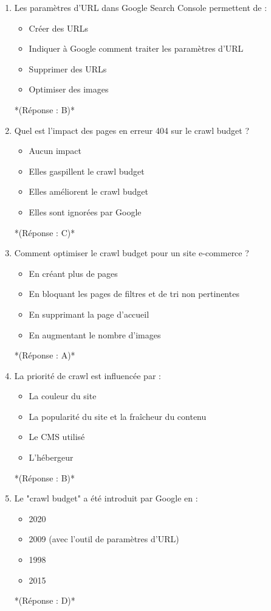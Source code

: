 \documentclass[12pt,a4paper,twoside]{report}
\begin{document}
\begin{enumerate}
\item Les paramètres d'URL dans Google Search Console permettent de :
\begin{itemize}
\item[A)] Créer des URLs
\item[B)] Indiquer à Google comment traiter les paramètres d'URL
\item[C)] Supprimer des URLs
\item[D)] Optimiser des images
\end{itemize}
*(Réponse : B)*

\item Quel est l'impact des pages en erreur 404 sur le crawl budget ?
\begin{itemize}
\item[A)] Aucun impact
\item[B)] Elles gaspillent le crawl budget
\item[C)] Elles améliorent le crawl budget
\item[D)] Elles sont ignorées par Google
\end{itemize}
*(Réponse : C)*

\item Comment optimiser le crawl budget pour un site e-commerce ?
\begin{itemize}
\item[A)] En créant plus de pages
\item[B)] En bloquant les pages de filtres et de tri non pertinentes
\item[C)] En supprimant la page d'accueil
\item[D)] En augmentant le nombre d'images
\end{itemize}
*(Réponse : A)*

\item La priorité de crawl est influencée par :
\begin{itemize}
\item[A)] La couleur du site
\item[B)] La popularité du site et la fraîcheur du contenu
\item[C)] Le CMS utilisé
\item[D)] L'hébergeur
\end{itemize}
*(Réponse : B)*

\item Le "crawl budget" a été introduit par Google en :
\begin{itemize}
\item[A)] 2020
\item[B)] 2009 (avec l'outil de paramètres d'URL)
\item[C)] 1998
\item[D)] 2015
\end{itemize}
*(Réponse : D)*


\end{enumerate}
\end{document}
